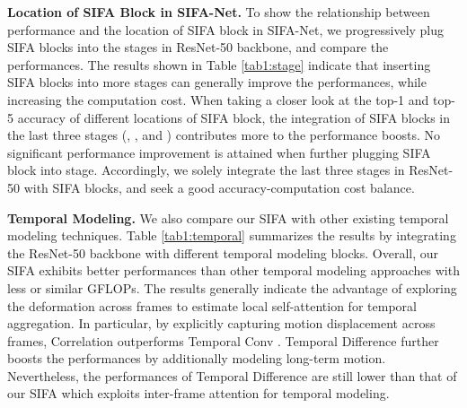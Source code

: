 \documentclass[10pt,twocolumn,letterpaper]{article}
\begin{document}
\textbf{Location of SIFA Block in SIFA-Net.}
To show the relationship between performance and the location of SIFA block in SIFA-Net, we progressively plug SIFA blocks into the stages in ResNet-50 backbone, and compare the performances.
The results shown in Table \ref{tab1:stage} indicate that inserting SIFA blocks into more stages can generally improve the performances, while increasing the computation cost.
When taking a closer look at the top-1 and top-5 accuracy of different locations of SIFA block, the integration of SIFA blocks in the last three stages (, , and ) contributes more to the performance boosts. No significant performance improvement is attained when further plugging SIFA block into  stage.
Accordingly, we solely integrate the last three stages in ResNet-50 with SIFA blocks, and seek a good accuracy-computation cost balance.

\textbf{Temporal Modeling.}
We also compare our SIFA with other existing temporal modeling techniques.
Table \ref{tab1:temporal} summarizes the results by integrating the ResNet-50 backbone with different temporal modeling blocks.
Overall, our SIFA exhibits better performances than other temporal modeling approaches with less or similar GFLOPs. The results generally indicate the advantage of exploring the deformation across frames to estimate local self-attention for temporal aggregation.
In particular, by explicitly capturing motion displacement across frames, Correlation \cite{Wang:CVPR20} outperforms Temporal Conv \cite{Tran:CVPR18}. Temporal Difference \cite{Wang:CVPR21} further boosts the performances by additionally modeling long-term motion. Nevertheless, the performances of Temporal Difference are still lower than that of our SIFA which exploits inter-frame attention for temporal modeling.
\end{document}

